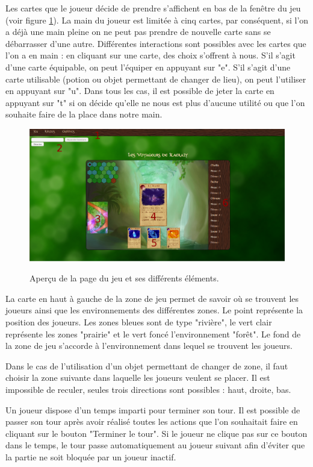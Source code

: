 \documentclass[12pt]{report}
\begin{document}
		Les cartes que le joueur décide de prendre s'affichent en bas de la fenêtre du jeu (voir figure \ref{fig:manual}). La main du joueur est limitée à cinq cartes, par conséquent, si l'on a déjà une main pleine on ne peut pas prendre de nouvelle carte sans se débarrasser d'une autre. Différentes interactions sont possibles avec les cartes que l'on a en main : en cliquant sur une carte, des choix s'offrent à nous. S'il s'agit d'une carte équipable, on peut l'équiper en appuyant sur "e". S'il s'agit d'une carte utilisable (potion ou objet permettant de changer de lieu), on peut l'utiliser en appuyant sur "u". Dans tous les cas, il est possible de jeter la carte en appuyant sur "t" si on décide qu'elle ne nous est plus d'aucune utilité ou que l'on souhaite faire de la place dans notre main.

		\begin{figure}[h!]
			\centering
			\includegraphics[scale=0.35]{images/manual.png}
			\label{fig:manual}
			\caption{Aperçu de la page du jeu et ses différents éléments.}
		\end{figure}

		La carte en haut à gauche de la zone de jeu permet de savoir où se trouvent les joueurs ainsi que les environnements des différentes zones. Le point représente la position des joueurs. Les zones bleues sont de type "rivière", le vert clair représente les zones "prairie" et le vert foncé l'environnement "forêt". Le fond de la zone de jeu s'accorde à l'environnement dans lequel se trouvent les joueurs.

		Dans le cas de l'utilisation d'un objet permettant de changer de zone, il faut choisir la zone suivante dans laquelle les joueurs veulent se placer. Il est impossible de reculer, seules trois directions sont possibles : haut, droite, bas.

		Un joueur dispose d'un temps imparti pour terminer son tour. Il est possible de passer son tour après avoir réalisé toutes les actions que l'on souhaitait faire en cliquant sur le bouton "Terminer le tour". Si le joueur ne clique pas sur ce bouton dans le temps, le tour passe automatiquement au joueur suivant afin d'éviter que la partie ne soit bloquée par un joueur inactif.
\end{document}
